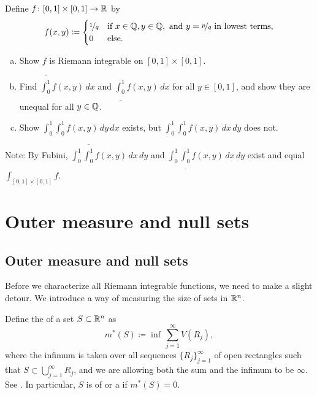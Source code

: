 \begin{exercise}
Define $f \colon [0,1] \times [0,1] \to {\mathbb{R}}$ by
\begin{equation*}
f(x,y) \coloneqq
\begin{cases}
\nicefrac{1}{q} & \text{if } x \in {\mathbb{Q}}, y \in {\mathbb{Q}}, \text{ and }
  y=\nicefrac{p}{q} \text{ in lowest terms,} \\
0               & \text{else.} 
\end{cases}
\end{equation*}
\begin{enumerate}[a)]
\item
Show $f$ is Riemann integrable on $[0,1] \times [0,1]$.
\item
Find 
$\overline{\int_0^1} f(x,y) \, dx$ and
$\underline{\int_0^1} f(x,y) \, dx$ for all $y \in [0,1]$, and show they are unequal for all $y
\in {\mathbb{Q}}$.
\item
Show
$\int_0^1 \int_0^1 f(x,y) \, dy \, dx$ exists, but
   $\int_0^1 \int_0^1 f(x,y) \, dx \, dy$ does not.
\end{enumerate}
Note: By Fubini,
$\int_0^1 \overline{\int_0^1} f(x,y) \, dx \, dy$ and 
$\int_0^1 \underline{\int_0^1} f(x,y) \, dx \, dy$ exist and equal
$\int_{[0,1]\times[0,1]} f$.
\end{exercise}


\sectionnewpage
\section{Outer measure and null sets}
\label{sec:outermeasure}



\subsection{Outer measure and null sets}

Before we characterize all Riemann integrable functions, we need to make
a slight detour.  We introduce a way of measuring the size of sets in ${\mathbb{R}}^n$.

\begin{defn}
Define the \emph{}
of a set $S \subset {\mathbb{R}}^n$ as
\begin{equation*}
m^*(S)
\coloneqq
\inf\,
\sum_{j=1}^\infty V(R_j) ,
\end{equation*}
where the infimum is taken over all sequences
$\{ R_j \}_{j=1}^\infty$ of open rectangles such that
$S \subset \bigcup_{j=1}^\infty R_j$,
and we are allowing both the sum and the infimum to be $\infty$.
See .
In particular, $S$ is of \emph{} or
a \emph{} if $m^*(S) = 0$.
\end{defn}

